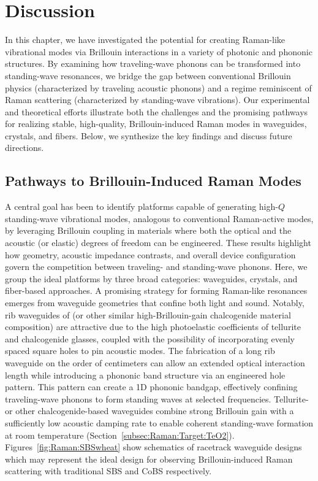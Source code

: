 
\section{Discussion}
\label{sec:Raman:Discussion}

In this chapter, we have investigated the potential for creating Raman-like vibrational modes via Brillouin interactions in a variety of photonic and phononic structures. By examining how traveling-wave phonons can be transformed into standing-wave resonances, we bridge the gap between conventional Brillouin physics (characterized by traveling acoustic phonons) and a regime reminiscent of Raman scattering (characterized by standing-wave vibrations). Our experimental and theoretical efforts illustrate both the challenges and the promising pathways for realizing stable, high-quality, Brillouin-induced Raman modes in waveguides, crystals, and fibers. Below, we synthesize the key findings and discuss future directions.

\subsection{Pathways to Brillouin-Induced Raman Modes}
\label{subsec:Raman:Pathways}

A central goal has been to identify platforms capable of generating high-\(Q\) standing-wave vibrational modes, analogous to conventional Raman-active modes, by leveraging Brillouin coupling in materials where both the optical and the acoustic (or elastic) degrees of freedom can be engineered. These results highlight how geometry, acoustic impedance contrasts, and overall device configuration govern the competition between traveling- and standing-wave phonons. Here, we group the ideal platforms by three broad categories: waveguides,  crystals, and fiber-based approaches. A promising strategy for forming Raman-like resonances emerges from waveguide geometries that confine both light and sound. Notably, rib waveguides of  (or other similar high-Brillouin-gain chalcogenide material composition) are attractive due to the high photoelastic coefficients of tellurite and chalcogenide glasses, coupled with the possibility of incorporating evenly spaced square holes to pin acoustic modes. The fabrication of a long rib waveguide on the order of centimeters can allow an extended optical interaction length while introducing a phononic band structure via an engineered hole pattern. This pattern can create a 1D phononic bandgap, effectively confining traveling-wave phonons to form standing waves at selected frequencies. Tellurite- or other chalcogenide-based waveguides combine strong Brillouin gain with a sufficiently low acoustic damping rate to enable coherent standing-wave formation at room temperature (Section~\ref{subsec:Raman:Target:TeO2}). Figures~\ref{fig:Raman:SBSwheat} show schematics of racetrack waveguide designs which may represent the ideal design for observing Brillouin-induced Raman scattering with traditional \ac{SBS} and \ac{CoBS} respectively.

